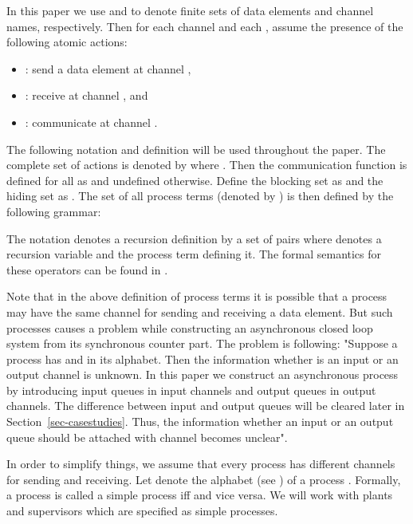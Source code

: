 \documentclass[a4paper,english,final]{article}
\theoremstyle{plain}
\theoremstyle{definition}
\begin{document}
In this paper we use  and  to denote finite sets of data elements and channel names, respectively. Then for each channel  and each , assume the presence of the following atomic actions:
\begin{itemize}
\item  : send a data element  at channel ,
\item  : receive  at channel , and
\item  : communicate  at channel .
\end{itemize}

The following notation and definition will be used throughout the paper. The complete set of actions is denoted by  where . Then the communication function  is defined for all  as  and undefined otherwise. Define the blocking set as  and the hiding set as .
The set of all process terms (denoted by ) is then defined by the following grammar:
\begin{center}

\end{center}
The notation  denotes a recursion definition by a set of pairs  where  denotes a recursion variable and  the process term defining it. The formal semantics for these operators can be found in \citep{acpbook}.

Note that in the above definition of process terms it is possible that a process may have the same channel for sending and receiving a data element. But such processes causes a problem while constructing an asynchronous closed loop system from its synchronous counter part. The problem is following: "Suppose a process  has  and  in its alphabet. Then the information whether  is an input or an output channel is unknown. In this paper we construct an asynchronous process by introducing input queues in input channels and output queues in output channels. The difference between input and output queues will be cleared later in Section~\ref{sec-casestudies}. Thus, the information whether an input or an output queue should be attached with channel  becomes unclear".

In order to simplify things, we assume that every process has different channels for sending and receiving. Let  denote the alphabet (see \citep{acpbook}) of a process . Formally, a process  is called a simple process iff  and vice versa. We will work with plants and supervisors which are specified as simple processes. 
\end{document}

